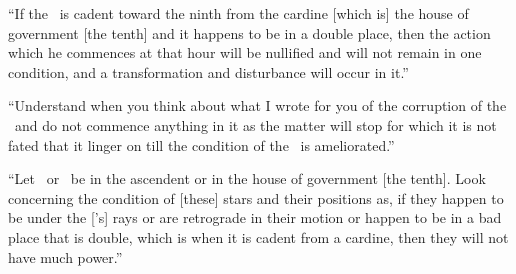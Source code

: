 ``If  the \Moon\, is cadent toward the ninth from the cardine [which is] the house of government [the tenth] and it happens to be in a double place, then the action which he commences at that hour will be nullified and will not remain in one condition, and a transformation and disturbance will occur in it.''

``Understand  when you think about what I wrote for you of the corruption of the \Moon\, and do not commence anything in it as the matter will stop for which it is not fated that it linger on till the condition of the \Moon\, is ameliorated.''

``Let  \Jupiter\, or \Venus\, be in the ascendent or in the house of government [the tenth]. Look concerning the condition of [these] stars and their positions as, if they happen to be under the [\Sun's] rays or are retrograde in their motion or happen to be in a bad place that is double, which is when it is cadent from a cardine, then they will not have much power.''

